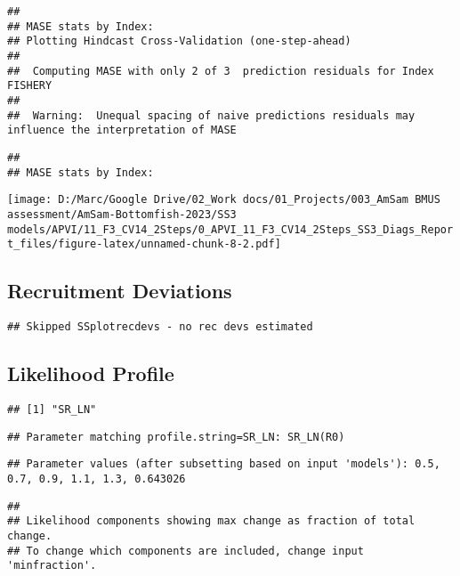\documentclass[
]{article}
\begin{document}
\begin{verbatim}
## 
## MASE stats by Index:
## Plotting Hindcast Cross-Validation (one-step-ahead) 
## 
##  Computing MASE with only 2 of 3  prediction residuals for Index FISHERY 
## 
##  Warning:  Unequal spacing of naive predictions residuals may influence the interpretation of MASE
\end{verbatim}

\begin{verbatim}
## 
## MASE stats by Index:
\end{verbatim}

\texttt{[image: D:/Marc/Google Drive/02\_Work docs/01\_Projects/003\_AmSam BMUS assessment/AmSam-Bottomfish-2023/SS3 models/APVI/11\_F3\_CV14\_2Steps/0\_APVI\_11\_F3\_CV14\_2Steps\_SS3\_Diags\_Report\_files/figure-latex/unnamed-chunk-8-2.pdf]}

\hypertarget{recruitment-deviations}{%
\subsection{Recruitment Deviations}\label{recruitment-deviations}}

\begin{verbatim}
## Skipped SSplotrecdevs - no rec devs estimated
\end{verbatim}

\hypertarget{likelihood-profile}{%
\subsection{Likelihood Profile}\label{likelihood-profile}}

\begin{verbatim}
## [1] "SR_LN"
\end{verbatim}

\begin{verbatim}
## Parameter matching profile.string=SR_LN: SR_LN(R0)
\end{verbatim}

\begin{verbatim}
## Parameter values (after subsetting based on input 'models'): 0.5, 0.7, 0.9, 1.1, 1.3, 0.643026
\end{verbatim}

\begin{verbatim}
## 
## Likelihood components showing max change as fraction of total change.
## To change which components are included, change input 'minfraction'.
\end{verbatim}
\end{document}
